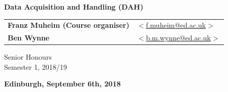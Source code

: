 \vspace{1cm}

\begin{center}
\end{center}

\vspace{1cm}

\begin{center}
{\LARGE\bf Data Acquisition and Handling (DAH)}
\end{center}

\begin{center}

\vspace{2cm}

\begin{tabular}{ll}
{\Large{\bf Franz Muheim (Course organiser)}} & \hspace*{5mm}\href{mailto:f.muheim@ed.ac.uk}{$<$f.muheim@ed.ac.uk$>$} \\
{\Large {\bf Ben Wynne} } & \hspace*{5mm} \href{mailto:b.m.wynne@ed.ac.uk}{$<$b.m.wynne@ed.ac.uk$>$} \\

\end{tabular}

\vspace{2cm}
{\Large Senior Honours} \\
{\Large Semester 1, 2018/19} \\

\vspace{2cm}


{\large\bf Edinburgh, September 6th, 2018}
\end{center}

\vspace{2cm}


